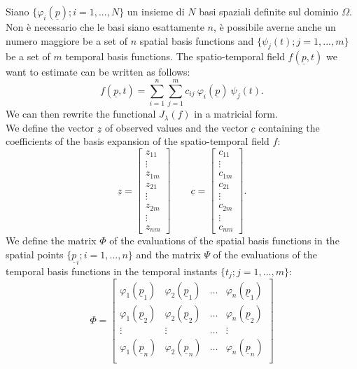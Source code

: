 \documentclass[a4paper,11pt,twoside,openright]{book}							%
\begin{document}
Siano $\{\varphi_i(\underline p); i=1, ... , N\}$ un insieme di $N$ basi spaziali definite sul dominio $\Omega$. Non è necessario che le basi siano esattamente $n$, è possibile averne anche un numero maggiore be a set of $n$ spatial basis functions and $\{\psi_j(t); j=1, ... , m\}$ be a set of $m$ temporal basis functions. The spatio-temporal field $f(\underline p, t)$ we want to estimate can be written as follows:
\begin{equation} 
\label{eq:basisexp}
f(\underline p,t)=\sum_{i=1}^n \sum_{j=1}^m c_{ij}\ \varphi_i(\underline p)\ \psi_j(t) .
\end{equation}
We can then rewrite the functional $J_\lambda (f)$ in a matricial form.\\ 
We define the vector $\underline z$ of observed values and the vector $\underline c$ containing the coefficients of the basis expansion of the spatio-temporal field $f$:
\begin{equation}
\underline z =
\begin{bmatrix}
z_{11}  \\
\vdots\\
z_{1m}  \\
z_{21}  \\
\vdots\\
z_{2m}  \\
\vdots\\
z_{nm}
\end{bmatrix}
\qquad
\underline c =
\begin{bmatrix}
c_{11}  \\
\vdots\\
c_{1m}  \\
c_{21}  \\
\vdots\\
c_{2m}  \\
\vdots\\
c_{nm}
\end{bmatrix}.
\end{equation}
We define the matrix $\Phi$ of the evaluations of the spatial basis functions in the spatial points $\{\underline p_i; i = 1,...,n\}$ and the matrix $\Psi$ of the evaluations of the temporal basis functions in the temporal instants $\{t_j; j = 1,...,m\}$:
$$
\Phi =
\begin{bmatrix}
\varphi_{1}(\underline p_1) & \varphi_{2}(\underline p_1) & \hdots & \varphi_{n}(\underline p_1)  \\
\varphi_{1}(\underline p_2) & \varphi_{2}(\underline p_2) & \hdots & \varphi_{n}(\underline p_2)  \\
\vdots & \vdots & \hdots & \vdots \\
\varphi_{1}(\underline p_n) & \varphi_{2}(\underline p_n) & \hdots & \varphi_{n}(\underline p_n)  \\
\end{bmatrix}
$$
\end{document}
